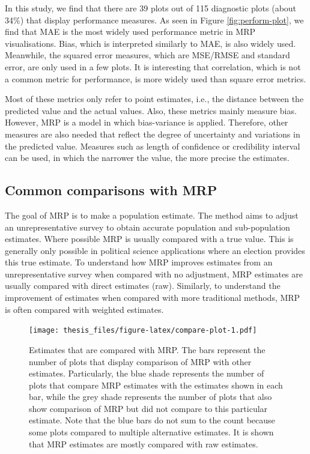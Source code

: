 \documentclass{monashthesis}
\begin{document}
In this study, we find that there are 39 plots out of 115 diagnostic plots (about 34\%) that display performance measures. As seen in Figure \ref{fig:perform-plot}, we find that MAE is the most widely used performance metric in MRP visualisations. Bias, which is interpreted similarly to MAE, is also widely used. Meanwhile, the squared error measures, which are MSE/RMSE and standard error, are only used in a few plots. It is interesting that correlation, which is not a common metric for performance, is more widely used than square error metrics.

Most of these metrics only refer to point estimates, i.e., the distance between the predicted value and the actual values. Also, these metrics mainly measure bias. However, MRP is a model in which bias-variance is applied. Therefore, other measures are also needed that reflect the degree of uncertainty and variations in the predicted value. Measures such as length of confidence or credibility interval can be used, in which the narrower the value, the more precise the estimates.

\hypertarget{common-comparisons-with-mrp}{%
\subsection{Common comparisons with MRP}\label{common-comparisons-with-mrp}}

The goal of MRP is to make a population estimate. The method aims to adjust an unrepresentative survey to obtain accurate population and sub-population estimates. Where possible MRP is usually compared with a true value. This is generally only possible in political science applications where an election provides this true estimate. To understand how MRP improves estimates from an unrepresentative survey when compared with no adjustment, MRP estimates are usually compared with direct estimates (raw). Similarly, to understand the improvement of estimates when compared with more traditional methods, MRP is often compared with weighted estimates.

\begin{figure}
\centering
\texttt{[image: thesis\_files/figure-latex/compare-plot-1.pdf]}
\caption{\label{fig:compare-plot}Estimates that are compared with MRP. The bars represent the number of plots that display comparison of MRP with other estimates. Particularly, the blue shade represents the number of plots that compare MRP estimates with the estimates shown in each bar, while the grey shade represents the number of plots that also show comparison of MRP but did not compare to this particular estimate. Note that the blue bars do not sum to the count because some plots compared to multiple alternative estimates. It is shown that MRP estimates are mostly compared with raw estimates.}
\end{figure}
\end{document}
